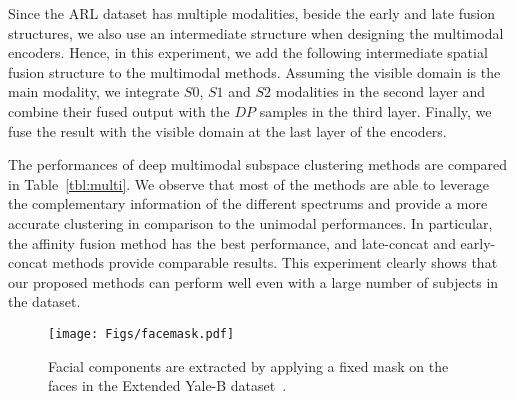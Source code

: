 \documentclass[journal]{IEEEtran}
\begin{document}
Since the ARL dataset has multiple modalities, beside the early and late fusion structures, we also use an intermediate structure when designing the multimodal encoders.		  Hence, in this experiment, we add the following intermediate spatial fusion structure to the multimodal methods.		 Assuming the visible domain is the main modality, we integrate $S0$, $S1$ and $S2$ modalities in the second layer and combine their fused output with the $DP$ samples in the third layer.		  Finally, we fuse the result with the visible domain at the last layer of the encoders.


The performances of deep multimodal subspace clustering methods are compared in Table~\ref{tbl:multi}.		 We observe that most of the methods are able to leverage the complementary information of the different spectrums and provide a more accurate clustering in comparison to the unimodal performances.		  In particular, the affinity fusion method has the best performance, and late-concat and early-concat methods provide comparable results.		This experiment clearly shows that our proposed methods can perform well even with a large number of subjects in the dataset.

\begin{figure}[t]
 \centering \texttt{[image: Figs/facemask.pdf]}
\vskip -10pt\caption{Facial components are extracted by applying a fixed mask on the faces in the Extended Yale-B dataset~\cite{9ptsLight}.}
\label{fig:mask}
\end{figure}
\end{document}
